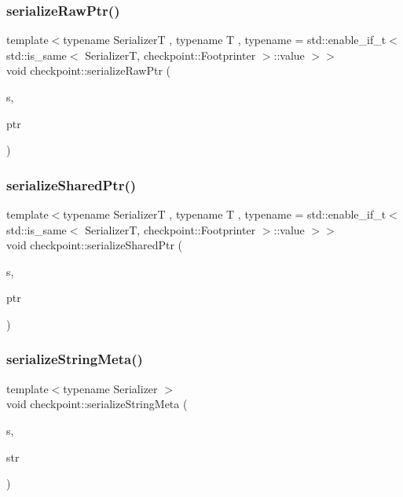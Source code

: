 \mbox{\label{namespacecheckpoint_a07f6216d4cee88085750f5a34ecb85df}} 
\subsubsection{\texorpdfstring{serialize\+Raw\+Ptr()}{serializeRawPtr()}}
{\footnotesize\ttfamily template$<$typename SerializerT , typename T , typename  = std\+::enable\+\_\+if\+\_\+t$<$    std\+::is\+\_\+same$<$      Serializer\+T,      checkpoint\+::\+Footprinter    $>$\+::value  $>$$>$ \\
void checkpoint\+::serialize\+Raw\+Ptr (\begin{DoxyParamCaption}\item[{SerializerT \&}]{s,  }\item[{T $\ast$}]{ptr }\end{DoxyParamCaption})}

\mbox{\label{namespacecheckpoint_a523f35e77c4dbca4a7653184d2b94a6f}} 
\subsubsection{\texorpdfstring{serialize\+Shared\+Ptr()}{serializeSharedPtr()}}
{\footnotesize\ttfamily template$<$typename SerializerT , typename T , typename  = std\+::enable\+\_\+if\+\_\+t$<$    std\+::is\+\_\+same$<$      Serializer\+T,      checkpoint\+::\+Footprinter    $>$\+::value  $>$$>$ \\
void checkpoint\+::serialize\+Shared\+Ptr (\begin{DoxyParamCaption}\item[{SerializerT \&}]{s,  }\item[{std\+::shared\+\_\+ptr$<$ T $>$ \&}]{ptr }\end{DoxyParamCaption})}

\mbox{\label{namespacecheckpoint_a1ea8e1ef9d0a10d26df77cb5309435aa}} 
\subsubsection{\texorpdfstring{serialize\+String\+Meta()}{serializeStringMeta()}}
{\footnotesize\ttfamily template$<$typename Serializer $>$ \\
void checkpoint\+::serialize\+String\+Meta (\begin{DoxyParamCaption}\item[{\hyperlink{structcheckpoint_1_1_serializer}{Serializer} \&}]{s,  }\item[{std\+::string \&}]{str }\end{DoxyParamCaption})}

